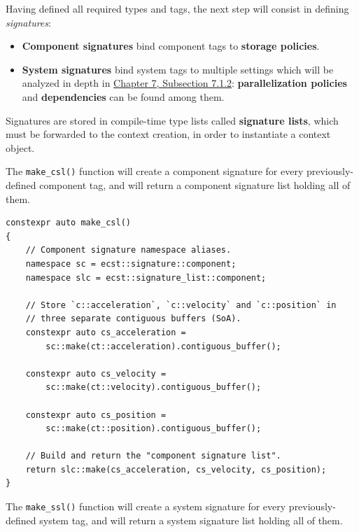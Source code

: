 \documentclass[twoside, 12pt, a4paper, openany]{book}
\begin{document}
Having defined all required types and tags, the next step will consist
in defining \emph{signatures}:

\begin{itemize}
\item
  \textbf{Component signatures} bind component tags to \textbf{storage
  policies}.
\item
  \textbf{System signatures} bind system tags to multiple settings which
  will be analyzed in depth in \protect\hyperlink{system_sigs}{Chapter
  7, Subsection 7.1.2}: \textbf{parallelization policies} and
  \textbf{dependencies} can be found among them.
\end{itemize}

Signatures are stored in compile-time type lists called
\textbf{signature lists}, which must be forwarded to the context
creation, in order to instantiate a context object.

The
\texttt{make_csl()}
function will create a component signature for every previously-defined
component tag, and will return a component signature list holding all of
them.

\begin{verbatim}
constexpr auto make_csl()
{
    // Component signature namespace aliases.
    namespace sc = ecst::signature::component;
    namespace slc = ecst::signature_list::component;

    // Store `c::acceleration`, `c::velocity` and `c::position` in
    // three separate contiguous buffers (SoA).
    constexpr auto cs_acceleration =
        sc::make(ct::acceleration).contiguous_buffer();

    constexpr auto cs_velocity =
        sc::make(ct::velocity).contiguous_buffer();

    constexpr auto cs_position =
        sc::make(ct::position).contiguous_buffer();

    // Build and return the "component signature list".
    return slc::make(cs_acceleration, cs_velocity, cs_position);
}
\end{verbatim}

The
\texttt{make_ssl()}
function will create a system signature for every previously-defined
system tag, and will return a system signature list holding all of them.
\end{document}
